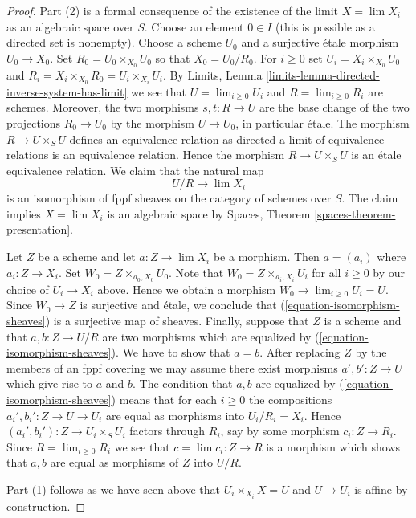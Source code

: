 \documentclass{stacks-project}
\theoremstyle{plain}
\theoremstyle{definition}
\theoremstyle{remark}
\numberwithin{equation}{subsection}
\def\lim{\mathop{\mathrm{lim}}\nolimits}
\begin{document}
\begin{proof}
Part (2) is a formal consequence of the existence of the
limit $X = \lim X_i$ as an algebraic space over $S$.
Choose an element $0 \in I$ (this is possible as a directed set is nonempty).
Choose a scheme $U_0$ and a surjective
\'etale morphism $U_0 \to X_0$. Set $R_0 = U_0 \times_{X_0} U_0$
so that $X_0 = U_0/R_0$. For $i \geq 0$ set
$U_i = X_i \times_{X_0} U_0$ and
$R_i = X_i \times_{X_0} R_0 = U_i \times_{X_i} U_i$.
By Limits, Lemma \ref{limits-lemma-directed-inverse-system-has-limit}
we see that $U = \lim_{i \geq 0} U_i$ and $R = \lim_{i \geq 0} R_i$
are schemes. Moreover, the two morphisms $s, t : R \to U$ are the base
change of the two projections $R_0 \to U_0$ by the morphism
$U \to U_0$, in particular \'etale. The morphism $R \to U \times_S U$
defines an equivalence relation as directed a limit of equivalence relations
is an equivalence relation. Hence the morphism
$R \to U \times_S U$ is an \'etale equivalence relation. We claim that
the natural map
\begin{equation}
\label{equation-isomorphism-sheaves}
U/R \longrightarrow \lim X_i
\end{equation}
is an isomorphism of fppf sheaves on the category of schemes over $S$.
The claim implies $X = \lim X_i$ is an algebraic
space by Spaces, Theorem \ref{spaces-theorem-presentation}.

\medskip\noindent
Let $Z$ be a scheme and let $a : Z \to \lim X_i$ be a morphism.
Then $a = (a_i)$ where $a_i : Z \to X_i$. Set $W_0 = Z \times_{a_0, X_0} U_0$.
Note that $W_0 = Z \times_{a_i, X_i} U_i$ for all $i \geq 0$ by our
choice of $U_i \to X_i$ above. Hence we obtain a morphism
$W_0 \to \lim_{i \geq 0} U_i = U$. Since $W_0 \to Z$ is surjective
and \'etale, we conclude that (\ref{equation-isomorphism-sheaves})
is a surjective map of sheaves. Finally, suppose that
$Z$ is a scheme and that $a, b : Z \to U/R$ are two morphisms
which are equalized by (\ref{equation-isomorphism-sheaves}).
We have to show that $a = b$.
After replacing $Z$ by the members of an fppf covering
we may assume there exist morphisms $a', b' : Z \to U$ which
give rise to $a$ and $b$. The condition that $a, b$ are
equalized by (\ref{equation-isomorphism-sheaves}) means that
for each $i \geq 0$ the compositions $a_i', b_i' : Z \to U \to U_i$
are equal as morphisms into $U_i/R_i = X_i$. Hence
$(a_i', b_i') : Z \to U_i \times_S U_i$ factors through
$R_i$, say by some morphism $c_i : Z \to R_i$. Since
$R = \lim_{i \geq 0} R_i$ we see that $c = \lim c_i : Z \to R$
is a morphism which shows that $a, b$ are equal as morphisms
of $Z$ into $U/R$.

\medskip\noindent
Part (1) follows as we have seen above that
$U_i \times_{X_i} X = U$ and $U \to U_i$ is affine by
construction.
\end{proof}
\end{document}
